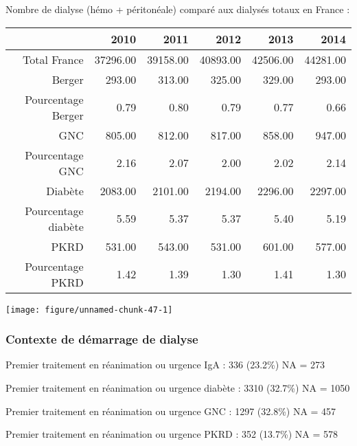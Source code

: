 \documentclass[11pt,a4paper]{article}\usepackage[]{graphicx}\usepackage[]{color}
\makeatletter
\def\maxwidth{ %
  \ifdim\Gin@nat@width>\linewidth
    \linewidth
  \else
    \Gin@nat@width
  \fi
}
\makeatother
\begin{document}
Nombre de dialyse (hémo + péritonéale) comparé aux dialysés totaux en France :

\begin{table}[H]
\centering
\begin{tabular}{rrrrrr}
  \hline
 & 2010 & 2011 & 2012 & 2013 & 2014 \\ 
  \hline
Total France & 37296.00 & 39158.00 & 40893.00 & 42506.00 & 44281.00 \\ 
  Berger & 293.00 & 313.00 & 325.00 & 329.00 & 293.00 \\ 
  Pourcentage Berger & 0.79 & 0.80 & 0.79 & 0.77 & 0.66 \\ 
  GNC & 805.00 & 812.00 & 817.00 & 858.00 & 947.00 \\ 
  Pourcentage GNC & 2.16 & 2.07 & 2.00 & 2.02 & 2.14 \\ 
  Diabète & 2083.00 & 2101.00 & 2194.00 & 2296.00 & 2297.00 \\ 
  Pourcentage diabète & 5.59 & 5.37 & 5.37 & 5.40 & 5.19 \\ 
  PKRD & 531.00 & 543.00 & 531.00 & 601.00 & 577.00 \\ 
  Pourcentage PKRD & 1.42 & 1.39 & 1.30 & 1.41 & 1.30 \\ 
   \hline
\end{tabular}
\end{table}

\texttt{[image: figure/unnamed-chunk-47-1]} 


    \subsubsection{Contexte de démarrage de dialyse}



    
Premier traitement en réanimation ou urgence IgA :  336 (23.2\%) NA = 273

Premier traitement en réanimation ou urgence diabète :  3310 (32.7\%) NA = 1050

Premier traitement en réanimation ou urgence GNC :  1297 (32.8\%) NA = 457

Premier traitement en réanimation ou urgence PKRD :  352 (13.7\%) NA = 578
~\\
\end{document}

